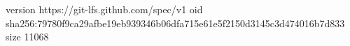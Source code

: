 version https://git-lfs.github.com/spec/v1
oid sha256:79780f9ca29afbe19eb939346b06dfa715e61e5f2150d3145c3d474016b7d833
size 11068
